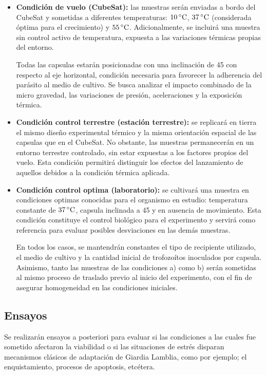     \begin{itemize}
      \item \textbf{Condición de vuelo (CubeSat):} las muestras serán enviadas a bordo del CubeSat y
      sometidas a diferentes temperaturas: $10\,^\circ\mathrm{C}$, $37\,^\circ\mathrm{C}$ (considerada óptima para el
      crecimiento) y $55\,^\circ\mathrm{C}$. Adicionalmente, se incluirá una muestra sin control activo de temperatura,
      expuesta a las variaciones térmicas propias del entorno.

      Todas las capsulas estarán posicionadas con una inclinación de 45 con respecto al eje horizontal, condición
      necesaria para favorecer la adherencia del parásito al medio de cultivo. Se busca analizar el
      impacto combinado de la micro gravedad, las variaciones de presión, aceleraciones
      y la exposición térmica.

      \item \textbf{Condición control terrestre (estación terrestre):} se replicará en tierra
      el mismo diseño experimental térmico y la misma orientación espacial de las capsulas
      que en el CubeSat. No obstante, las muestras permanecerán en un entorno terrestre
      controlado, sin estar expuestas a los factores propios del vuelo. Esta condición permitirá
      distinguir los efectos del lanzamiento de aquellos debidos a la condición térmica
      aplicada.

      \item \textbf{Condición control optima (laboratorio):} se cultivará una muestra en condiciones optimas
      conocidas para el organismo en estudio: temperatura constante de
      $37\,^\circ\mathrm{C}$, capsula inclinada a 45 y en ausencia de movimiento. Esta condición constituye
      el control biológico para el experimento y servirá como referencia para evaluar posibles
      desviaciones en las demás muestras.

      En todos los casos, se mantendrán constantes el tipo de recipiente utilizado, el medio de cultivo y la cantidad
      inicial de trofozoítos inoculados por
      capsula. Asimismo, tanto las muestras de las condiciones a) como b) serán sometidas al mismo
      proceso de traslado previo al inicio del experimento, con el fin de asegurar homogeneidad en
      las condiciones iniciales.
    \end{itemize}

  \subsection{Ensayos}
    Se realizarán ensayos a posteriori para evaluar si las condiciones a las cuales fue sometido afectaron la
    viabilidad o si las situaciones de estrés disparan mecanismos clásicos de adaptación de Giardia Lamblia, como por
    ejemplo; el enquistamiento, procesos de apoptosis, etcétera.

